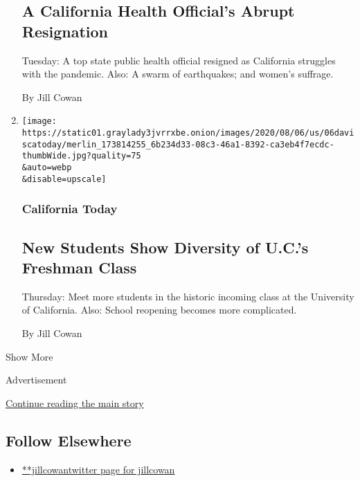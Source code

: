\begin{enumerate}
{  \subsection{A California Health Official's Abrupt
  Resignation}\label{a-california-health-officials-abrupt-resignation}}

  Tuesday: A top state public health official resigned as California
  struggles with the pandemic. Also: A swarm of earthquakes; and women's
  suffrage.

  By Jill Cowan
\item
  \href{/2020/08/06/us/university-of-california-incoming-class.html}{}

  \texttt{[image: https://static01.graylady3jvrrxbe.onion/images/2020/08/06/us/06daviscatoday/merlin\_173814255\_6b234d33-08c3-46a1-8392-ca3eb4f7ecdc-thumbWide.jpg?quality=75\\\&auto=webp\\\&disable=upscale]}

  \hypertarget{california-today-7}{%
  \subsubsection{California Today}\label{california-today-7}}

  \hypertarget{new-students-show-diversity-of-ucs-freshman-class}{%
  \subsection{New Students Show Diversity of U.C.'s Freshman
  Class}\label{new-students-show-diversity-of-ucs-freshman-class}}

  Thursday: Meet more students in the historic incoming class at the
  University of California. Also: School reopening becomes more
  complicated.

  By Jill Cowan
\end{enumerate}

Show More

Advertisement

\protect\hyperlink{after-mid2}{Continue reading the main story}

\hypertarget{follow-elsewhere}{%
\subsection{Follow Elsewhere}\label{follow-elsewhere}}

\begin{itemize}
\tightlist
\item
  \href{https://twitter.com/jillcowan}{**jillcowantwitter page for
  jillcowan}
\end{itemize}

